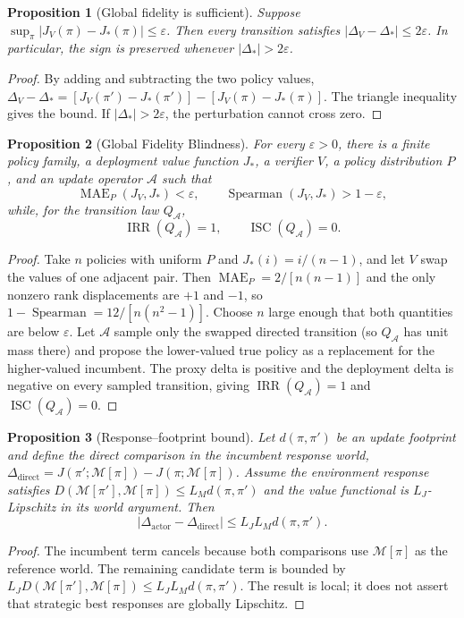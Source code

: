 \documentclass{article} %
\newcommand{\M}{\mathcal{M}}
\newcommand{\pii}{\pi}
\newcommand{\pip}{\pi'}
\newcommand{\dproxy}{\Delta_V}
\newcommand{\dtrue}{\Delta_*}
\newtheorem{proposition}{Proposition}
\begin{document}
\begin{proposition}[Global fidelity is sufficient]
Suppose $\sup_\pi|J_V(\pi)-J_*(\pi)|\leq\varepsilon$. Then every transition
satisfies $|\dproxy-\dtrue|\leq2\varepsilon$. In particular, the sign is
preserved whenever $|\dtrue|>2\varepsilon$.
\end{proposition}
\begin{proof}
By adding and subtracting the two policy values,
$\dproxy-\dtrue=[J_V(\pip)-J_*(\pip)]-[J_V(\pii)-J_*(\pii)]$.
The triangle inequality gives the bound. If $|\dtrue|>2\varepsilon$, the
perturbation cannot cross zero.
\end{proof}

\begin{proposition}[Global Fidelity Blindness]
For every $\varepsilon>0$, there is a finite policy family, a deployment value
function $J_*$, a verifier $V$, a policy distribution $P$, and an update
operator $\mathcal A$ such that
\[
  \operatorname{MAE}_{P}(J_V,J_*)<\varepsilon,\qquad
  \operatorname{Spearman}(J_V,J_*)>1-\varepsilon,
\]
while, for the transition law $Q_{\mathcal A}$,
\[
  \operatorname{IRR}(Q_{\mathcal A})=1,
  \qquad
  \operatorname{ISC}(Q_{\mathcal A})=0.
\]
\end{proposition}
\begin{proof}
Take $n$ policies with uniform $P$ and $J_*(i)=i/(n-1)$, and let $V$ swap the
values of one adjacent pair. Then $\operatorname{MAE}_{P}=2/[n(n-1)]$ and the only nonzero rank
displacements are $+1$ and $-1$, so
$1-\operatorname{Spearman}=12/[n(n^2-1)]$. Choose $n$ large enough that both
quantities are below $\varepsilon$. Let $\mathcal A$ sample only the swapped
directed transition (so $Q_{\mathcal A}$ has unit mass there) and propose the
lower-valued true policy as a replacement for the higher-valued incumbent. The
proxy delta is positive and the deployment delta is negative on every sampled
transition, giving $\operatorname{IRR}(Q_{\mathcal A})=1$ and
$\operatorname{ISC}(Q_{\mathcal A})=0$.
\end{proof}

\begin{proposition}[Response--footprint bound]
Let $d(\pii,\pip)$ be an update footprint and define the direct comparison in
the incumbent response world, $\Delta_{\mathrm{direct}}=
J(\pip;\M[\pii])-J(\pii;\M[\pii])$. Assume the environment response
satisfies $D(\M[\pip],\M[\pii])\leq L_Md(\pii,\pip)$ and the value functional is
$L_J$-Lipschitz in its world argument. Then
\begin{equation}
 |\Delta_{\mathrm{actor}}-\Delta_{\mathrm{direct}}|
 \leq L_JL_Md(\pii,\pip).
\end{equation}
\end{proposition}
\begin{proof}
The incumbent term cancels because both comparisons use $\M[\pii]$ as the
reference world. The remaining candidate term is bounded by
$L_JD(\M[\pip],\M[\pii])\leq L_JL_Md(\pii,\pip)$. The result is local; it does
not assert that strategic best responses are globally Lipschitz.
\end{proof}
\end{document}
